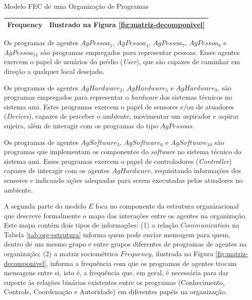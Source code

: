 \begin{section}{Modelo FEC de uma Organização de Programas}
\begin{table}[h!]
{\begin{tabular}{| p{5cm} | p{10cm}|}
            \textbf{Frequency} & Ilustrado na Figura \ref{fig:matriz-decomponivel} \newline \\

            \hline
            \end{tabular}
        }{
    }
    \end{table}
    
    
    Os programas de agentes $AgPessoa_1$, $AgPessoa_4$, $AgPessoa_7$, $AgPessoa_8$ e $AgPessoa_{11}$ são programas empregados para representar pessoas. Esses agentes exercem o papel de usuários do prédio (\textit{User}), que são capazes de caminhar em direção a qualquer local desejado. 
    
    Os programas de agentes $AgHardware_2$, $AgHardware_5$ e $AgHardware_9$, são programas empregados para representar o \textit{hardware} dos sistemas técnicos no sistema \acrshort{ami}. Estes programas exercem o papel de sensores e/ou de atuadores (\textit{Devices}), capazes de perceber o ambiente, movimentar um aspirador e aspirar sujeira, além de interagir com os programas do tipo $AgPessoas$.
    
    Os programas de agentes $AgSoftware_3$, $AgSoftware_6$ e $AgSoftware_{10}$ são programas que implementam os componentes do \textit{software} no sistema técnico do sistema \acrshort{ami}. Esses programas exercem o papel de controladores (\textit{Controller}) capazes de interagir com os agentes $AgHardware$, requisitando informações dos sensores e indicando ações adequadas para serem executadas pelos atuadores no ambiente.
    
    A segunda parte do modelo $E$ foca no componente da estrutura organizacional que descreve formalmente o mapa das interações entre os agentes na organização. Este mapa contém dois tipos de informações: (1) a relação $Communication$ na Tabela \ref{tab:org-estrutura} informa quem pode enviar mensagem para quem, dentro de um mesmo grupo e entre grupos diferentes de programas de agentes na organização; (2) a matriz sociométrica $Frequency$, ilustrada na Figura \ref{fig:matriz-decomponivel}, informa a frequência com que os programas de agentes trocam mensagens entre si, isto é, a frequência que, em geral, é necessária para dar suporte às relações binárias existentes entre os programas (Conhecimento, Controle, Coordenação e Autoridade) em diferentes papéis na organização. 
        

\end{section}
